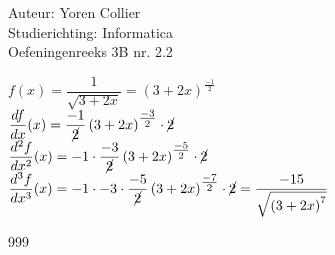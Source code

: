 \documentclass[a4paper]{article}
\newcommand{\Lh}{\left(} %
\newcommand{\Rh}{\right)}
\newcommand{\schrap}{\cancel}
\begin{document}
\noindent \large Auteur: Yoren Collier \\
\noindent \large Studierichting: Informatica\\
\noindent \large Oefeningenreeks 3B nr. 2.2\\

\medskip

\normalsize

$f(x) = \dfrac{1}{\sqrt{3 +2x}} = \Lh 3 +2x\Rh ^{\tfrac{-1}{2}}$\\

$\dfrac{df}{dx}(x) = \dfrac{-1}{\schrap{2}} \Lh 3 +2x \Rh ^{\tfrac{-3}{2}} \cdot \schrap{2}$\\

$\dfrac{d^2f}{dx^2}(x) = -1 \cdot \dfrac{-3}{\schrap{2}} \Lh 3 +2x \Rh ^{\tfrac{-5}{2}} \cdot \schrap{2}$\\

$\dfrac{d^3f}{dx^3}(x) = -1 \cdot -3 \cdot \dfrac{-5}{\schrap{2}} \Lh 3+2x \Rh ^{\tfrac{-7}{2}} \cdot \schrap{2} = \dfrac{-15}{\sqrt{\Lh 3 +2x \Rh ^7}}$\\

\begin{thebibliography}{999}
\end{thebibliography}
\end{document}
